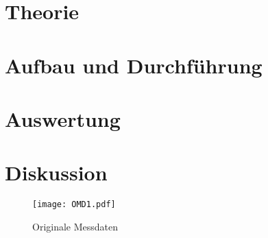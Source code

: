 

\setlength{\parindent}{0em}



\tableofcontents
%

\newpage
%

\section{Theorie}



\section{Aufbau und Durchführung}

\newpage
\FloatBarrier

\section{Auswertung}

\newpage
\FloatBarrier

\section{Diskussion}



\nocite{*}
\printbibliography
\label{LastPage}

\begin{figure}
  \centering
  \texttt{[image: OMD1.pdf]}
  \caption{Originale Messdaten}
  \label{OMD}
\end{figure}



